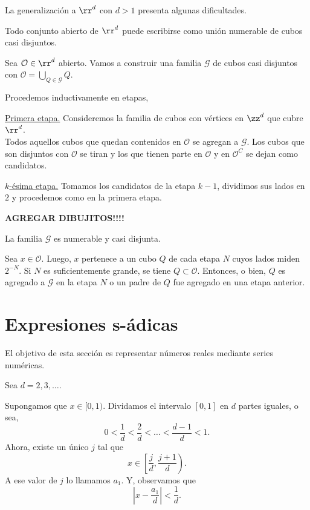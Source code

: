 La generalizaci\'on a $\rr^d$ con $d>1$ presenta algunas dificultades.

\begin{teorema}{}
Todo conjunto abierto de $\rr^d$ puede escribirse como uni\'on numerable de cubos casi disjuntos.
\end{teorema}

\begin{demo}
Sea $\mathcal{O}\in \rr^d$ abierto. Vamos a construir una familia $\mathcal{G}$ de cubos casi disjuntos con $\mathcal{O}=\bigcup\limits_{Q \in \mathcal{G}} Q$.

Procedemos inductivamente en etapas, 

\underline{Primera etapa.}
Consideremos la familia de cubos con v\'ertices en $\zz^d$ que cubre $\rr^d$.
\\
Todos aquellos cubos que quedan contenidos en $\mathcal{O}$ se agregan a $\mathcal{G}$.  Los  cubos  que son disjuntos con $\mathcal{O}$ se tiran y los que tienen parte en $\mathcal{O}$ y en $\mathcal{O}^C$ se dejan  como candidatos.

\underline{$k$-\'esima  etapa.}
Tomamos los candidatos de la etapa $k-1$, dividimos sus lados en $2$ y procedemos como en la primera etapa. 

\textbf{
AGREGAR DIBUJITOS!!!!}

La familia $\mathcal{G}$ es numerable y casi disjunta. 

Sea $x\in \mathcal{O}$. Luego,  $x$ pertenece a un cubo $Q$ de cada etapa $N$ cuyos lados miden $2^{-N}$. Si $N$ es suficientemente grande, se tiene  $Q\subset \mathcal{O}$. Entonces, o bien, $Q$ es agregado a $\mathcal{G}$ en la etapa $N$ o un padre de $Q$ fue agregado en una etapa anterior.
 \end{demo}
 
 \section{Expresiones s-\'adicas}
 
 El objetivo de esta secci\'on es representar n\'umeros reales mediante series num\'ericas.
 
 Sea $d=2,3,\ldots$. 
 
 Supongamos que $x \in [0,1)$. Dividamos el intervalo  $[0,1]$ en $d$ partes iguales, o sea, 
 \[
 0<\frac{1}{d}<\frac{2}{d}<\ldots<\frac{d-1}{d}<1.
 \]
 Ahora, existe un \'unico $j$ tal que 
 \[
 x \in \left[\frac{j}{d}, \frac{j+1}{d}\right).
 \]
 A ese valor de $j$ lo llamamos $a_1$. 
 Y, observamos que \[ \left|x-\frac{a_1}{d}\right|<\frac{1}{d}.\]
 
